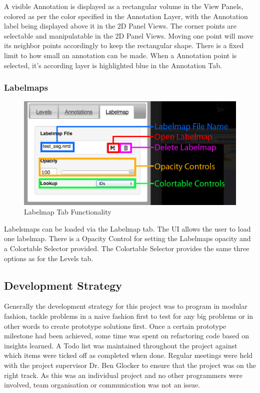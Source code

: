 \documentclass[a4paper,11pt,twoside]{article}
\begin{document}
A visible Annotation is displayed as a rectangular volume in the View Panels, colored as per the color specified in the Annotation Layer, with the Annotation label being displayed above it in the 2D Panel Views. The corner points are selectable and manipulatable in the 2D Panel Views. Moving one point will move its neighbor points accordingly to keep the rectangular shape. There is a fixed limit to how small an annotation can be made. When a Annotation point is selected, it's according layer is highlighted blue in the Annotation Tab.




\subsubsection{Labelmaps}

\begin{figure}[ht!]
\centering
\includegraphics[width=140mm]{graphics/features_06.png}
\caption{Labelmap Tab Functionality}
\label{fig:UIdesign1}
\end{figure}

Labelsmaps can be loaded via the Labelmap tab. The UI allows the user to load one labelmap. There is a Opacity Control for setting the Labelmaps opacity and a Colortable Selector provided. The Colortable Selector provides the same three options as for the Levels tab.




\subsection{Development Strategy}

Generally the development strategy for this project was to program in modular fashion, tackle problems in a naive fashion first to test for any big problems or in other words to create prototype solutions first. Once a certain prototype milestone had been achieved, some time was spent on refactoring code based on insights learned. A Todo list was maintained throughout the project against which items were ticked off as completed when done. Regular meetings were held with the project supervisor Dr. Ben Glocker to ensure that the project was on the right track. As this was an individual project and no other programmers were involved, team organisation or communication was not an issue.
\end{document}
